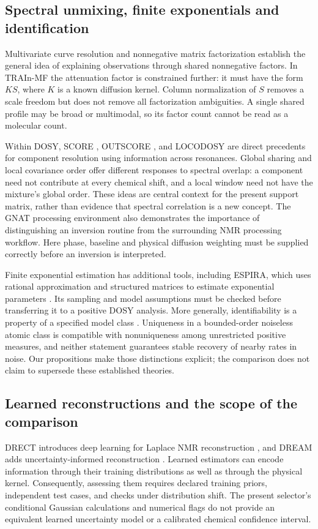 \subsection{Spectral unmixing, finite exponentials and identification}
Multivariate curve resolution \cite{mcr} and nonnegative matrix factorization \cite{nmf} establish the general idea of explaining observations through shared nonnegative factors. In TRAIn-MF the attenuation factor is constrained further: it must have the form $KS$, where $K$ is a known diffusion kernel. Column normalization of $S$ removes a scale freedom but does not remove all factorization ambiguities. A single shared profile may be broad or multimodal, so its factor count cannot be read as a molecular count.

Within DOSY, SCORE \cite{score}, OUTSCORE \cite{outscore}, and LOCODOSY \cite{locodosy} are direct precedents for component resolution using information across resonances. Global sharing and local covariance order offer different responses to spectral overlap: a component need not contribute at every chemical shift, and a local window need not have the mixture's global order. These ideas are central context for the present support matrix, rather than evidence that spectral correlation is a new concept. The GNAT processing environment \cite{gnat} also demonstrates the importance of distinguishing an inversion routine from the surrounding NMR processing workflow. Here phase, baseline and physical diffusion weighting must be supplied correctly before an inversion is interpreted.

Finite exponential estimation has additional tools, including ESPIRA, which uses rational approximation and structured matrices to estimate exponential parameters \cite{espira}. Its sampling and model assumptions must be checked before transferring it to a positive DOSY analysis. More generally, identifiability is a property of a specified model class \cite{teicher}. Uniqueness in a bounded-order noiseless atomic class is compatible with nonuniqueness among unrestricted positive measures, and neither statement guarantees stable recovery of nearby rates in noise. Our propositions make those distinctions explicit; the comparison does not claim to supersede these established theories.

\subsection{Learned reconstructions and the scope of the comparison}
DRECT introduces deep learning for Laplace NMR reconstruction \cite{drect}, and DREAM adds uncertainty-informed reconstruction \cite{dream}. Learned estimators can encode information through their training distributions as well as through the physical kernel. Consequently, assessing them requires declared training priors, independent test cases, and checks under distribution shift. The present selector's conditional Gaussian calculations and numerical flags do not provide an equivalent learned uncertainty model or a calibrated chemical confidence interval.

